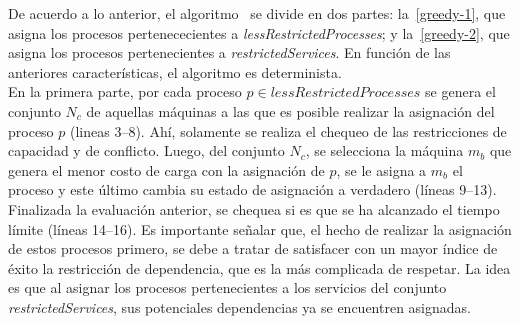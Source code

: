 \documentclass[../informe2.tex]{subfiles}
\begin{document}
De acuerdo a lo anterior, el algoritmo \greedy\ se divide en dos partes: la~\ref{greedy-1}, que asigna los procesos pertenececientes a \textit{lessRestrictedProcesses}; y la~\ref{greedy-2}, que asigna los procesos pertenecientes a \textit{restrictedServices}. En función de las anteriores características, el algoritmo es determinista.\\
En la primera parte, por cada proceso $p \in lessRestrictedProcesses$ se genera el conjunto $N_c$ de aquellas máquinas a las que es posible realizar la asignación del proceso $p$ (lineas 3--8). Ahí, solamente se realiza el chequeo de las restricciones de capacidad y de conflicto. Luego, del conjunto $N_c$, se selecciona la máquina $m_b$ que genera el menor costo de carga con la asignación de $p$, se le asigna a $m_b$ el proceso y este último cambia su estado de asignación a verdadero (líneas 9--13). Finalizada la evaluación anterior, se chequea si es que se ha alcanzado el tiempo límite (líneas 14--16). Es importante señalar que, el hecho de realizar la asignación de estos procesos primero, se debe a tratar de satisfacer con un mayor índice de éxito la restricción de dependencia, que es la más complicada de respetar. La idea es que al asignar los procesos pertenecientes a los servicios del conjunto \textit{restrictedServices}, sus potenciales dependencias ya se encuentren asignadas.
\end{document}
